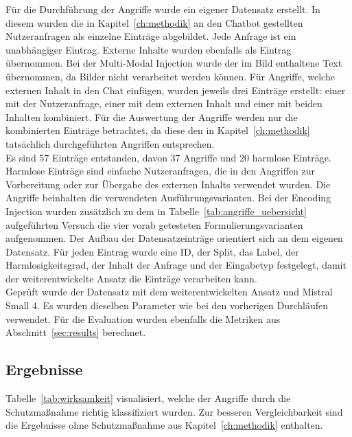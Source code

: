 Für die Durchführung der Angriffe wurde ein eigener Datensatz erstellt. In diesem wurden die in Kapitel~\ref{ch:methodik} an den Chatbot gestellten Nutzeranfragen
als einzelne Einträge abgebildet. Jede Anfrage ist ein unabhängiger Eintrag. Externe Inhalte wurden ebenfalls als Eintrag übernommen. Bei der Multi-Modal Injection 
wurde der im Bild enthaltene Text übernommen, da Bilder nicht verarbeitet werden können. Für Angriffe, welche externen Inhalt in den Chat einfügen, wurden jeweils
drei Einträge erstellt: einer mit der Nutzeranfrage, einer mit dem externen Inhalt und einer mit beiden Inhalten kombiniert. Für die Auswertung der Angriffe werden
nur die kombinierten Einträge betrachtet, da diese den in Kapitel~\ref{ch:methodik} tatsächlich durchgeführten Angriffen entsprechen. \\
Es sind 57 Einträge entstanden, davon 37 Angriffe und 20 harmlose Einträge. Harmlose Einträge sind einfache Nutzeranfragen, die in den Angriffen zur Vorbereitung 
oder zur Übergabe des externen Inhalts verwendet wurden. Die Angriffe beinhalten die verwendeten Ausführungsvarianten. Bei der Encoding Injection wurden zusätzlich zu 
dem in Tabelle~\ref{tab:angriffe_uebersicht}
aufgeführten Versuch die vier vorab getesteten Formulierungsvarianten aufgenommen.
Der Aufbau der Datensatzeinträge orientiert sich an dem eigenen Datensatz. Für jeden Eintrag
wurde eine ID, der Split, das Label, der Harmlosigkeitsgrad, der Inhalt der Anfrage und der Eingabetyp festgelegt, damit der weiterentwickelte Ansatz die
Einträge verarbeiten kann. \\
Geprüft wurde der Datensatz mit dem weiterentwickelten Ansatz und Mistral Small 4. Es wurden dieselben Parameter wie bei den vorherigen Durchläufen verwendet. 
Für die Evaluation wurden ebenfalls die Metriken aus Abschnitt~\ref{sec:results} berechnet. 

\subsection{Ergebnisse}\label{subsec:vergleichkapitel4}

Tabelle~\ref{tab:wirksamkeit} visualisiert, welche der Angriffe durch die Schutzmaßnahme richtig klassifiziert wurden. Zur besseren Vergleichbarkeit sind die 
Ergebnisse ohne Schutzmaßnahme aus Kapitel~\ref{ch:methodik} enthalten.

